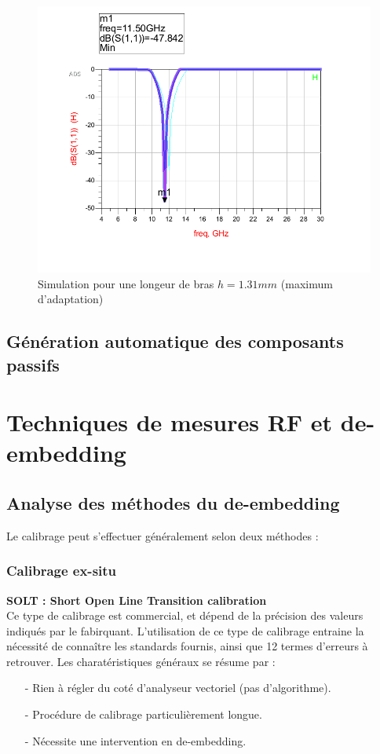 \documentclass[a4paper]{article}
\begin{document}
\begin{figure}[!htb]
\begin{center}
  \includegraphics[scale=0.45]{adaptation_height_1-31mm.png}
  \caption{Simulation pour une longeur de bras $h = 1.31 mm$ (maximum d'adaptation)}
  \label{adaptation_height_1-31mm}
\end{center}
\end{figure}

\clearpage
\subsection{G\'en\'eration automatique des composants passifs}


\clearpage
\section{Techniques de mesures RF et de-embedding}
\subsection{Analyse des m\'ethodes du de-embedding}
Le calibrage peut s'effectuer g\'en\'eralement selon deux m\'ethodes :

\subsubsection{Calibrage ex-situ}
\textbf{SOLT : Short Open Line Transition calibration} \\
Ce type de calibrage est commercial, et d\'epend de la pr\'ecision des valeurs indiqu\'es par le fabirquant.
L'utilisation de ce type de calibrage entraine la n\'ecessit\'e de conna\^itre les standards fournis, ainsi
que 12 termes d'erreurs \`a retrouver.
Les charat\'eristiques g\'en\'eraux se r\'esume par :
\begin{itemize}
  \item[-] Rien \`a r\'egler du cot\'e d'analyseur vectoriel (pas d'algorithme).
  \item[-] Proc\'edure de calibrage particuli\`erement longue.
  \item[-] N\'ecessite une intervention en de-embedding.
\end{itemize}
\end{document}
